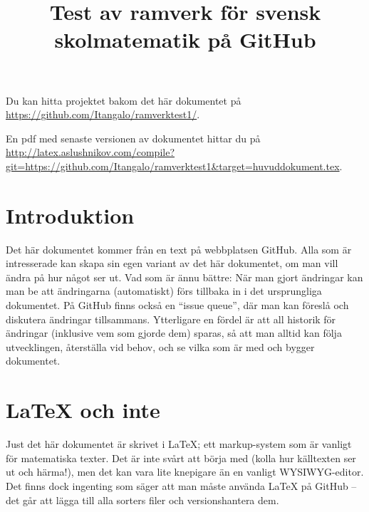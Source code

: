 \documentclass[12pt]{article}
\title{Test av ramverk för svensk skolmatematik på GitHub}
\date{}
\begin{document}
  \maketitle

  Du kan hitta projektet bakom det här dokumentet på \url{https://github.com/Itangalo/ramverktest1/}.
  
  En pdf med senaste versionen av dokumentet hittar du på \url{http://latex.aslushnikov.com/compile?git=https://github.com/Itangalo/ramverktest1&target=huvuddokument.tex}.
  
  \section{Introduktion}
  Det här dokumentet kommer från en text på webbplatsen GitHub.
  Alla som är intresserade kan skapa sin egen variant av det här dokumentet, om man vill ändra på hur något ser ut.
  Vad som är ännu bättre: När man gjort ändringar kan man be att ändringarna (automatiskt) förs tillbaka in i det ursprungliga dokumentet.
  På GitHub finns också en ``issue queue'', där man kan föreslå och diskutera ändringar tillsammans.
  Ytterligare en fördel är att all historik för ändringar (inklusive vem som gjorde dem) sparas, så att man alltid kan följa utvecklingen, återställa vid behov, och se vilka som är med och bygger dokumentet.
  
  \section{LaTeX och inte}
  Just det här dokumentet är skrivet i LaTeX; ett markup-system som är vanligt för matematiska texter.
  Det är inte svårt att börja med (kolla hur källtexten ser ut och härma!), men det kan vara lite knepigare än en vanligt WYSIWYG-editor.
  Det finns dock ingenting som säger att man måste använda LaTeX på GitHub -- det går att lägga till alla sorters filer och versionshantera dem.

  
  
  

  
\end{document}
